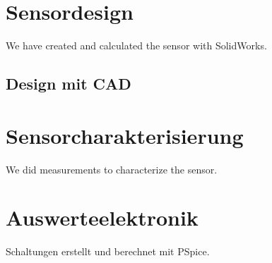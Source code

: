 \documentclass[10pt,a4paper]{article}
\begin{document}
\section{Sensordesign}
We have created and calculated the sensor with SolidWorks. 
\subsection{Design mit CAD}

\section{Sensorcharakterisierung}
We did measurements to characterize the sensor.
\section{Auswerteelektronik}
Schaltungen erstellt und berechnet mit PSpice.
\end{document}
